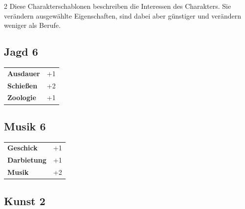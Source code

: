 \begin{multicols}{2}
Diese Charakterschablonen beschreiben die Interessen des Charakters. Sie verändern ausgewählte Eigenschaften, sind dabei aber günstiger und verändern weniger als Berufe.

\begin{tcolorbox}
    \subsection*{Jagd \hfill \small{6 }}
    \tcblower




\begin{tabular}{@{}ll@{}}
    \textbf{Ausdauer} & +1\\
    \textbf{Schießen} & +2\\
    \textbf{Zoologie} & +1\\
\end{tabular}


\end{tcolorbox}

\begin{tcolorbox}
    \subsection*{Musik \hfill \small{6 }}
    \tcblower




\begin{tabular}{@{}ll@{}}
    \textbf{Geschick} & +1\\
    \textbf{Darbietung} & +1\\
    \textbf{Musik} & +2\\
\end{tabular}


\end{tcolorbox}

\begin{tcolorbox}
    \subsection*{Kunst \hfill \small{2 }}
    \tcblower





\end{tcolorbox}
\end{multicols}
